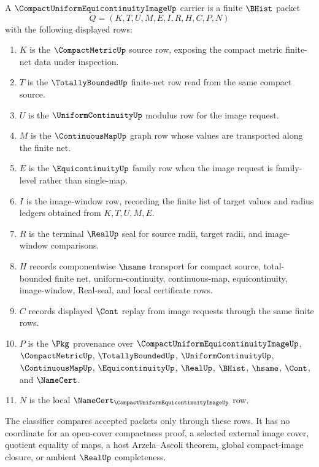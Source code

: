 \begin{definition}
\label{def:compact-uniform-equicontinuity-image-carrier}
A $\CompactUniformEquicontinuityImageUp$ carrier is a finite $\BHist$ packet
$$
Q=(K,T,U,M,E,I,R,H,C,P,N)
$$
with the following displayed rows:
\begin{enumerate}
\item $K$ is the $\CompactMetricUp$ source row, exposing the compact metric finite-net data under inspection.
\item $T$ is the $\TotallyBoundedUp$ finite-net row read from the same compact source.
\item $U$ is the $\UniformContinuityUp$ modulus row for the image request.
\item $M$ is the $\ContinuousMapUp$ graph row whose values are transported along the finite net.
\item $E$ is the $\EquicontinuityUp$ family row when the image request is family-level rather than single-map.
\item $I$ is the image-window row, recording the finite list of target values and radius ledgers obtained from $K,T,U,M,E$.
\item $R$ is the terminal $\RealUp$ seal for source radii, target radii, and image-window comparisons.
\item $H$ records componentwise $\hsame$ transport for compact source, total-bounded finite net, uniform-continuity, continuous-map, equicontinuity, image-window, Real-seal, and local certificate rows.
\item $C$ records displayed $\Cont$ replay from image requests through the same finite rows.
\item $P$ is the $\Pkg$ provenance over $\CompactUniformEquicontinuityImageUp$, $\CompactMetricUp$, $\TotallyBoundedUp$, $\UniformContinuityUp$, $\ContinuousMapUp$, $\EquicontinuityUp$, $\RealUp$, $\BHist$, $\hsame$, $\Cont$, and $\NameCert$.
\item $N$ is the local $\NameCert_{\CompactUniformEquicontinuityImageUp}$ row.
\end{enumerate}
The classifier compares accepted packets only through these rows. It has no coordinate for an open-cover compactness proof, a selected external image cover, quotient equality of maps, a host Arzela--Ascoli theorem, global compact-image closure, or ambient $\RealUp$ completeness.
\end{definition}

